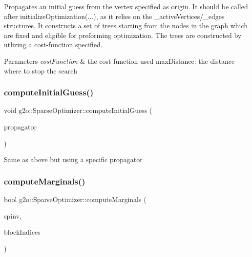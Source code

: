 Propagates an initial guess from the vertex specified as origin. It should be called after initialize\+Optimization(...), as it relies on the \+\_\+active\+Vertices/\+\_\+edges structures. It constructs a set of trees starting from the nodes in the graph which are fixed and eligible for preforming optimization. The trees are constructed by utlizing a cost-\/function specified. 
\begin{DoxyParams}{Parameters}
{\em cost\+Function} & the cost function used  max\+Distance\+: the distance where to stop the search \\
\hline
\end{DoxyParams}
\mbox{\label{classg2o_1_1_sparse_optimizer_a2fba11c8572fce4a8c1bcca4fa3e43fb}} 
\subsubsection{\texorpdfstring{compute\+Initial\+Guess()}{computeInitialGuess()}\hspace{0.1cm}{\footnotesize\ttfamily [2/2]}}
{\footnotesize\ttfamily void g2o\+::\+Sparse\+Optimizer\+::compute\+Initial\+Guess (\begin{DoxyParamCaption}\item[{\mbox{\hyperlink{classg2o_1_1_estimate_propagator_cost}{Estimate\+Propagator\+Cost}} \&}]{propagator }\end{DoxyParamCaption})\hspace{0.3cm}{\ttfamily [virtual]}}

Same as above but using a specific propagator \mbox{\label{classg2o_1_1_sparse_optimizer_a656be8b8244a48dc1207f29eec77af5a}} 
\subsubsection{\texorpdfstring{compute\+Marginals()}{computeMarginals()}\hspace{0.1cm}{\footnotesize\ttfamily [1/3]}}
{\footnotesize\ttfamily bool g2o\+::\+Sparse\+Optimizer\+::compute\+Marginals (\begin{DoxyParamCaption}\item[{\mbox{\hyperlink{classg2o_1_1_sparse_block_matrix}{Sparse\+Block\+Matrix}}$<$ Matrix\+Xd $>$ \&}]{spinv,  }\item[{const std\+::vector$<$ std\+::pair$<$ int, int $>$ $>$ \&}]{block\+Indices }\end{DoxyParamCaption})}

